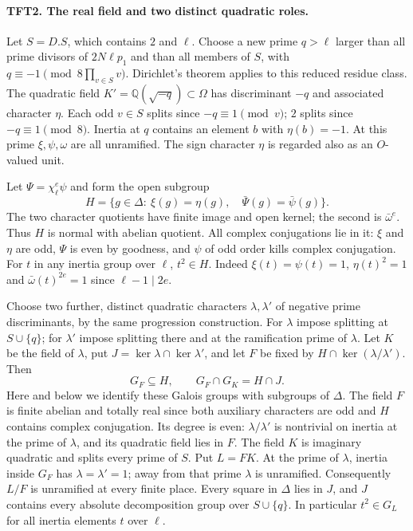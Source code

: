 \paragraph{TFT2. The real field and two distinct quadratic roles.}
Let $S=D.S$, which contains $2$ and $\ell$. Choose a new prime
$q>\ell$ larger than all prime divisors of $2N\ell p_1$ and than
all members of $S$, with $q\equiv-1\pmod{8\prod_{v\in S}v}$.
Dirichlet's theorem applies to this reduced residue class. The
quadratic field $K'=\mathbb Q(\sqrt{-q})\subset\Omega$ has
discriminant $-q$ and associated character $\eta$. Each odd
$v\in S$ splits since $-q\equiv1\pmod v$; $2$ splits since
$-q\equiv1\pmod8$. Inertia at $q$ contains an element $b$
with $\eta(b)=-1$. At this prime $\xi,\psi,\omega$ are all unramified.
The sign character $\eta$ is regarded also as an $O$-valued unit.

Let $\Psi=\chi_\ell^e\psi$ and form the open subgroup
\[
 H=\{g\in\Delta:\ \xi(g)=\eta(g),\quad
                          \bar\Psi(g)=\bar\psi(g)\}.
\]
The two character quotients have finite image and open kernel;
the second is $\bar\omega^e$. Thus $H$ is normal with abelian quotient.
All complex conjugations lie in it: $\xi$ and $\eta$ are odd,
$\Psi$ is even by goodness, and $\psi$ of odd order kills
complex conjugation. For $t$ in any inertia group over $\ell$,
$t^2\in H$. Indeed $\xi(t)=\psi(t)=1$, $\eta(t)^2=1$ and
$\bar\omega(t)^{2e}=1$ since $\ell-1\mid 2e$.

Choose two further, distinct quadratic characters $\lambda,\lambda'$
of negative prime discriminants, by the same progression construction.
For $\lambda$ impose splitting at $S\cup\{q\}$; for $\lambda'$
impose splitting there and at the ramification prime of $\lambda$.
Let $K$ be the field of $\lambda$, put
$J=\ker\lambda\cap\ker\lambda'$, and let $F$ be fixed by
$H\cap\ker(\lambda/\lambda')$. Then
\[
 G_F\subseteq H,\qquad G_F\cap G_K=H\cap J.
\]
Here and below we identify these Galois groups with subgroups
of $\Delta$. The field $F$ is finite abelian and totally real since
both auxiliary characters are odd and $H$ contains complex conjugation.
Its degree is even: $\lambda/\lambda'$ is nontrivial on inertia at the
prime of $\lambda$, and its quadratic field lies in $F$.
The field $K$ is imaginary quadratic and splits every prime of $S$.
Put $L=FK$. At the prime of $\lambda$, inertia inside $G_F$
has $\lambda=\lambda'=1$; away from that prime $\lambda$ is unramified.
Consequently $L/F$ is unramified at every finite place.
Every square in $\Delta$ lies in $J$, and $J$ contains every absolute
decomposition group over $S\cup\{q\}$. In particular
$t^2\in G_L$ for all inertia elements $t$ over $\ell$.

